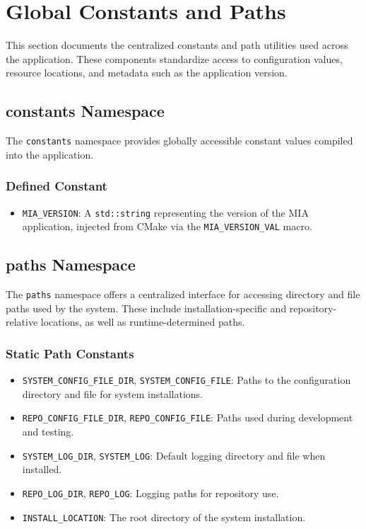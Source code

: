 \section{Global Constants and Paths}

This section documents the centralized constants and path utilities used across the application. These components standardize access to configuration values, resource locations, and metadata such as the application version.

\subsection{constants Namespace}

The \texttt{constants} namespace provides globally accessible constant values compiled into the application.

\subsubsection*{Defined Constant}
\begin{itemize}
	\item \texttt{MIA\_VERSION}: A \texttt{std::string} representing the version of the MIA application, injected from CMake via the \texttt{MIA\_VERSION\_VAL} macro.
\end{itemize}

\subsection{paths Namespace}

The \texttt{paths} namespace offers a centralized interface for accessing directory and file paths used by the system. These include installation-specific and repository-relative locations, as well as runtime-determined paths.

\subsubsection*{Static Path Constants}
\begin{itemize}
	\item \texttt{SYSTEM\_CONFIG\_FILE\_DIR}, \texttt{SYSTEM\_CONFIG\_FILE}: Paths to the configuration directory and file for system installations.
	\item \texttt{REPO\_CONFIG\_FILE\_DIR}, \texttt{REPO\_CONFIG\_FILE}: Paths used during development and testing.
	\item \texttt{SYSTEM\_LOG\_DIR}, \texttt{SYSTEM\_LOG}: Default logging directory and file when installed.
	\item \texttt{REPO\_LOG\_DIR}, \texttt{REPO\_LOG}: Logging paths for repository use.
	\item \texttt{INSTALL\_LOCATION}: The root directory of the system installation.
\end{itemize}

